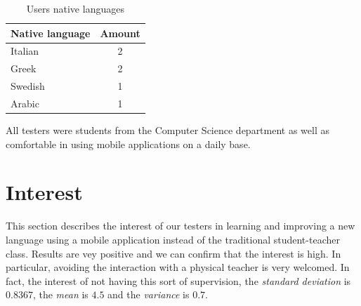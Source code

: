 \begin{table}[!ht]
    \centering
    \begin{tabular}{|l|c|}
        \hline
        \multicolumn{1}{|c|}{\textbf{Native language}} & \textbf{Amount} \\ \hline
        Italian                                        & 2               \\ \hline
        Greek                                          & 2               \\ \hline
        Swedish                                        & 1               \\ \hline
        Arabic                                         & 1               \\ \hline
    \end{tabular}
    \caption{Users native languages}
    \label{table:native_languages}
\end{table}

\noindent All testers were students from the Computer Science department as well as comfortable in using mobile applications on a daily base.

\section{Interest}
\label{sub:Interest}

This section describes the interest of our testers in learning and improving a new language using a mobile application instead of the traditional student-teacher class. Results are vey positive and we can confirm that the interest is high. In particular, avoiding the interaction with a physical teacher is very welcomed. In fact, the interest of not having this sort of supervision, the \textit{standard deviation} is $0.8367$, the \textit{mean} is $4.5$ and the \textit{variance} is $0.7$.

